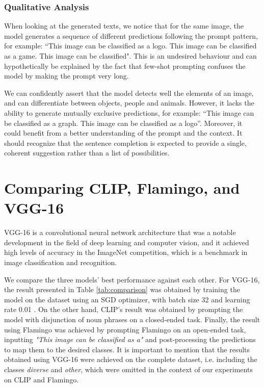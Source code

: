 \subsubsection{Qualitative Analysis}

When looking at the generated texts, we notice that for the same image, the model generates a sequence of different predictions following the prompt pattern, for example: “This image can be classified as a logo. This image can be classified as a game. This image can be classified". This is an undesired behaviour and can hypothetically be explained by the fact that few-shot prompting confuses the model by making the prompt very long.

We can confidently assert that the model detects well the elements of an image, and can differentiate between objects, people and animals. However, it lacks the ability to generate mutually exclusive predictions, for example: “This image can be classified as a graph. This image can be classified as a logo”. Moreover, it could benefit from a better understanding of the prompt and the context. It should recognize that the sentence completion is expected to provide a single, coherent suggestion rather than a list of possibilities.

\section{Comparing CLIP, Flamingo, and VGG-16} 

VGG-16 is a convolutional neural network architecture that was a notable development in the field of deep learning and computer vision, and it achieved high levels of accuracy in the ImageNet competition, which is a benchmark in image classification and recognition.

We compare the three models' best performance against each other. For VGG-16, the result presented in Table \ref{tab:comparison} was obtained by training the model on the dataset using an SGD optimizer, with batch size 32 and learning rate 0.01 \parencite{dhlab2022impresso}. On the other hand, CLIP's result was obtained by prompting the model with disjunction of noun phrases on a closed-ended task. Finally, the result using Flamingo was achieved by prompting Flamingo on an open-ended task, inputting \textit{"This image can be classified as a"} and post-processing the predictions to map them to the desired classes. It is important to mention that the results obtained using VGG-16 were achieved on the complete dataset, i.e. including the classes \textit{diverse} and \textit{other}, which were omitted in the context of our experiments on CLIP and Flamingo.

